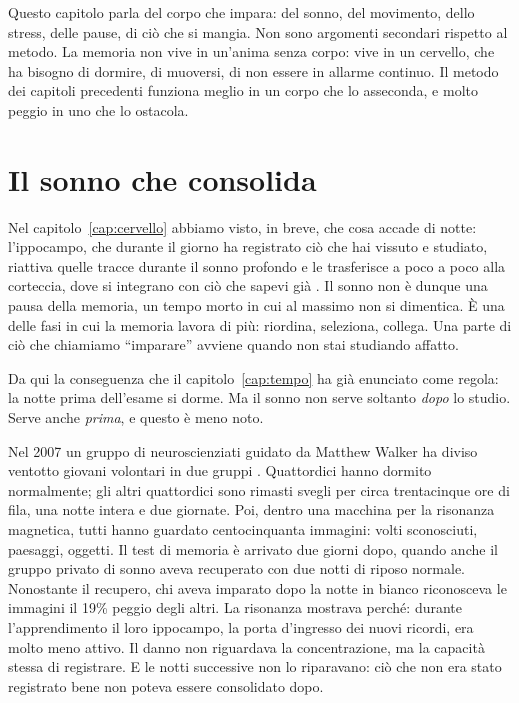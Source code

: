 Questo capitolo parla del corpo che impara: del sonno, del movimento,
dello stress, delle pause, di ciò che si mangia. Non sono argomenti
secondari rispetto al metodo. La memoria non vive in un'anima senza
corpo: vive in un cervello, che ha bisogno di dormire, di muoversi, di
non essere in allarme continuo. Il metodo dei capitoli precedenti
funziona meglio in un corpo che lo asseconda, e molto peggio in uno che
lo ostacola.

\section{Il sonno che consolida}

Nel capitolo~\ref{cap:cervello} abbiamo visto, in breve, che cosa
accade di notte: l'ippocampo, che durante il giorno ha registrato ciò
che hai vissuto e studiato, riattiva quelle tracce durante il sonno
profondo e le trasferisce a poco a poco alla corteccia, dove si
integrano con ciò che sapevi già \parencite{rasch2013}. Il sonno non è
dunque una pausa della memoria, un tempo morto in cui al massimo non si
dimentica. È una delle fasi in cui la memoria lavora di più: riordina,
seleziona, collega. Una parte di ciò che chiamiamo
\enquote{imparare} avviene quando non stai studiando affatto.

Da qui la conseguenza che il capitolo~\ref{cap:tempo} ha già
enunciato come regola: la notte prima dell'esame si dorme. Ma il sonno
non serve soltanto \emph{dopo} lo studio. Serve anche \emph{prima}, e
questo è meno noto.

Nel 2007 un gruppo di neuroscienziati guidato da Matthew Walker ha
diviso ventotto giovani volontari in due gruppi \parencite{yoo2007}.
Quattordici hanno dormito normalmente; gli altri quattordici sono
rimasti svegli per circa trentacinque ore di fila, una notte intera e
due giornate. Poi, dentro una macchina per la risonanza magnetica,
tutti hanno guardato centocinquanta immagini: volti sconosciuti,
paesaggi, oggetti. Il test di memoria è arrivato due giorni dopo,
quando anche il gruppo privato di sonno aveva recuperato con due notti
di riposo normale. Nonostante il recupero, chi aveva imparato dopo la
notte in bianco riconosceva le immagini il 19\% peggio degli altri. La
risonanza mostrava perché: durante l'apprendimento il loro ippocampo,
la porta d'ingresso dei nuovi ricordi, era molto meno attivo. Il danno
non riguardava la concentrazione, ma la capacità stessa di registrare.
E le notti successive non lo riparavano: ciò che non era stato
registrato bene non poteva essere consolidato dopo.

